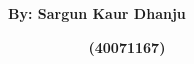 \documentclass[12pt]{article}
\begin{document}
\vspace{\baselineskip}
\begin{justify}
{\fontsize{16pt}{19.2pt}\selectfont \textbf{\ \ \ \ \ \ \ \ \ \ \ \ \ \ \ \ \ \ \ \ \ \ \ \ \ \ \ \ \ \ \ \ \ \ \ \ \ \ \ \  By: Sargun Kaur Dhanju}\par}
\end{justify}\par

\begin{justify}
{\fontsize{16pt}{19.2pt}\selectfont \textbf{\ \ \ \ \ \ \ \ \ \ \ \ \ \ \ \ \ \ \ \ \ \ \ \ \ \ \ \ \ \ \ \ \ \ \ \ \ \ \ \ \ \ \ \ \ \ \ \ \ \  (40071167)}\par}
\end{justify}\par


\vspace{\baselineskip}

\vspace{\baselineskip}

\vspace{\baselineskip}

\vspace{\baselineskip}

\vspace{\baselineskip}

\vspace{\baselineskip}

\vspace{\baselineskip}

\vspace{\baselineskip}

\vspace{\baselineskip}

\vspace{\baselineskip}

\vspace{\baselineskip}

\vspace{\baselineskip}

\vspace{\baselineskip}

\vspace{\baselineskip}

\vspace{\baselineskip}

\vspace{\baselineskip}

\vspace{\baselineskip}
\end{document}

